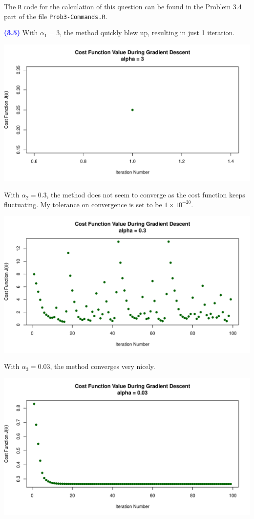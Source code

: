 \documentclass[a4paper,12pt]{article}
\newcommand{\code}[1]{\texttt{#1}}
\newcommand{\qnum}[1]{\noindent\textcolor{blue}{\textbf{(#1)}}}
\begin{document}
The \code{R} code for the calculation of this question can be found in the Problem 3.4 part of the file \code{Prob3-Commands.R}.
\bigskip


\qnum{3.5}
With $\alpha_1 = 3$, the method quickly blew up, resulting in just 1 iteration.
\begin{center}
    \includegraphics[width=0.9\linewidth]{Images/Prob3-5-alpha1.pdf}
\end{center}

With $\alpha_2 = 0.3$, the method does not seem to converge as the cost function keeps fluctuating. My tolerance on convergence is set to be $1\times 10^{-20}$.
\begin{center}
    \includegraphics[width=0.9\linewidth]{Images/Prob3-5-alpha2-itr100.pdf}
\end{center}


With $\alpha_3 = 0.03$, the method converges very nicely.
\begin{center}
    \includegraphics[width=0.9\linewidth]{Images/Prob3-5-alpha3-itr100.pdf}
\end{center}
\end{document}
